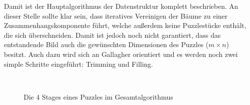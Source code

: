 \documentclass{whswinvcbook}
\begin{document}
Damit ist der Hauptalgorithmus der Datenstruktur komplett beschrieben. An dieser Stelle sollte klar sein, dass iteratives Vereinigen der Bäume zu einer Zusammenhangskomponente führt, welche außerdem keine Puzzlestücke enthält, die sich überschneiden. Damit ist jedoch noch nicht garantiert, dass das entstandende Bild auch die gewünschten Dimensionen des Puzzles ($m\times n$) besitzt. Auch dazu wird sich an Gallagher \cite{gallagher,crisjim} orientiert und es werden noch zwei simple Schritte eingeführt: Trimming und Filling.
\begin{figure}[H]
    \centering
    \quad\quad
    \\
    \quad\quad
    \caption{Die 4 Stages eines Puzzles im Gesamtalgorithmus}
    \label{fig-dsf-stages}
\end{figure}
\end{document}
